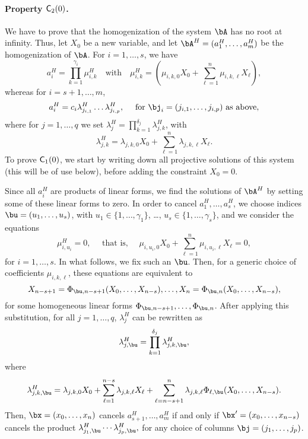 \documentclass[12pt]{article}
\begin{document}
\paragraph{Property $\mathsf{C}_2(0)$.} We have to prove that the homogenization
of the system $\bA$ has no root at infinity. Thus, let $X_0$ be a new
variable, and let $\bA^H=(a_1^H,\dots,a_m^H)$ be the homogenization
of $\bA$. For $i=1,\dots,s$, we have
$$a_i^H=\prod_{k=1}^{\gamma_i} \mu^H_{i,k} \quad\text{with}\quad \mu^H_{i,k}=(\mu_{i,k,0}X_0 + \sum_{\ell = 1}^{n}\mu_{i,k,\ell}X_\ell),$$
whereas for $i=s+1,\dots,m$, 
$$a_i^H=c_i \lambda^H_{j_{i,1}}\ldots \lambda^H_{j_{i,p}}, \quad \text{~for~} \bj_i=(j_{i,1},\dots,j_{i,p}) \text{~as above},$$
where for $j=1,\dots,q$ we set 
$\lambda^H_j = \prod_{k=1}^{\delta_j}\lambda^H_{j,k}$,
with
$$\lambda^H_{j,k}=\lambda_{j,k,0}X_0 + \sum_{\ell = 1}^{n}\lambda_{j,k,\ell}X_\ell.$$
To prove  $\mathsf{C}_1(0)$, we start by writing down all projective
solutions of this system (this will be of use below), before adding
the constraint $X_0=0$.

Since all $a_i^H$ are products of linear forms, we find the solutions
of $\bA^H$ by setting some of these linear forms to zero. In order to
cancel $a_1^H,\dots,a_s^H$, we choose indices $\bu=(u_1,\dots,u_s)$,
with $u_1\in\{1,\dots,\gamma_1\}$, \dots,
$u_s\in\{1,\dots,\gamma_s\}$, and we consider the equations 
$$\mu^H_{i,u_i}=0, \quad \text{~that is,~} \quad \mu_{i,u_i,0}X_0 + \sum_{\ell = 1}^{n}\mu_{i,u_i,\ell}X_\ell =0,$$ for $i=1,\dots,s$.
In what follows, we fix such an $\bu$.
Then, for a generic choice of coefficients $\mu_{i,k,\ell}$, these equations
are equivalent to
$$X_{n-s+1}=\Phi_{\bu,n-s+1}(X_0,\dots,X_{n-s}),\dots,X_{n}=\Phi_{\bu,n}(X_0,\dots,X_{n-s}),$$
for some homogeneous linear forms
$\Phi_{\bu,n-s+1},\dots,\Phi_{\bu,n}$.  After applying this
substitution, for all $j=1,\dots,q$, $\lambda^H_j$ can be rewritten as
$$\lambda^H_{j,\bu}=\prod_{k=1}^{\delta_j}\lambda^H_{j,k,\bu},$$
where 
$$\lambda^H_{j,k,\bu}=\lambda_{j,k,0}X_0 + \sum_{\ell =
  1}^{n-s}\lambda_{j,k,\ell}X_\ell + \sum_{\ell =
  n-s+1}^{n}\lambda_{j,k,\ell}
\Phi_{\ell,\bu}(X_0,\dots,X_{n-s}).$$ Then,
$\bx=(x_0,\dots,x_n)$ cancels $a^H_{s+1},\dots,a^H_m$ if and only if
$\bx'=(x_0,\dots,x_{n-s})$ cancels the product
$\lambda^H_{j_1,\bu}\cdots \lambda^H_{j_p,\bu},$ for any choice of columns
$\bj=(j_1,\dots,j_p)$.
\end{document}

